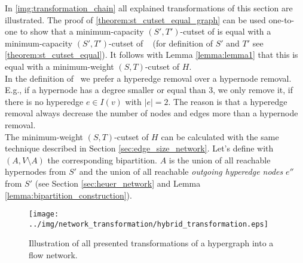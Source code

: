 In \autoref{img:transformation_chain} all explained transformations of this section are illustrated.
The proof of \autoref{theorem:st_cutset_equal_graph} can be used one-to-one to show that a minimum-capacity
$(S',T')$-cutset of  is equal with a minimum-capacity $(S',T')$-cutset of \ShortHybrid~
(for definition of $S'$ and $T'$ see \autoref{theorem:st_cutset_equal}). It follows with Lemma \ref{lemma:lemma1}
that this is equal with a minimum-weight $(S,T)$-cutset of $H$. \\
In the definition of \ShortHybrid~we prefer a hyperedge removal over a hypernode removal. E.g., if
a hypernode has a degree smaller or equal than $3$, we only remove it, if there is no hyperedge
$e \in I(v)$ with $|e| = 2$. The reason is that a hyperedge removal always decrease the number of nodes
and edges more than a hypernode removal. \\
The minimum-weight $(S,T)$-cutset of $H$ can be calculated with the same technique described in Section
\ref{sec:edge_size_network}. Let's define with $(A,V\setminus A)$ the corresponding bipartition.
$A$ is the union of all reachable hypernodes from $S'$ and the union of
all reachable \emph{outgoing hyperedge nodes} $e''$ from $S'$ (see Section \ref{sec:heuer_network} 
and Lemma \ref{lemma:bipartition_construction}).



\begin{figure}
\centering
\texttt{[image: ../img/network\_transformation/hybrid\_transformation.eps]}
\caption{Illustration of all presented transformations of a hypergraph into a flow network.}
\label{img:transformation_chain}
\end{figure}
